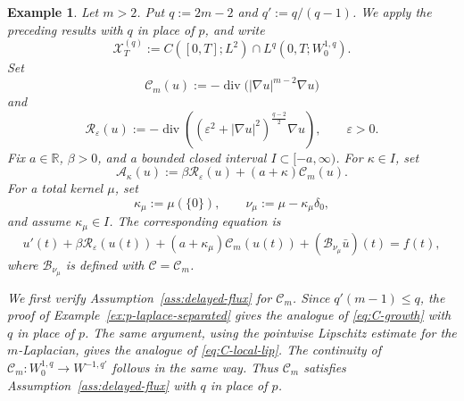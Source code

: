 \documentclass[a4paper,11pt,oneside,reqno]{amsart}
\newtheorem{example}[theorem]{Example}
\newcounter{c}
\newcounter{d}
\newcounter{b}
\newcommand{\R}{\mathbb{R}}
\newcommand{\diver}{\operatorname{div}}
\begin{document}
\begin{example}
\label{ex:collapsing-atom}
Let \(m>2\). Put \(q:=2m-2\) and \(q':=q/(q-1)\).
We apply the preceding results with \(q\) in place of \(p\), and write
\[
 \mathcal X_T^{(q)}
 :=
 C([0,T];L^2)\cap L^q(0,T;W^{1,q}_0).
\]
Set
\[
 \mathcal C_m(u):=
 -\diver\bigl(|\nabla u|^{m-2}\nabla u\bigr)
\]
and
\[
 \mathcal R_\varepsilon(u)
 :=
 -\diver\left(
 (\varepsilon^2+|\nabla u|^2)^{\frac{q-2}{2}}\nabla u
 \right),
 \qquad \varepsilon>0 .
\]
Fix \(a\in\R\), \(\beta>0\), and a bounded closed interval
\(I\subset[-a,\infty)\). For \(\kappa\in I\), set
\[
 \mathcal A_\kappa(u)
 :=
 \beta\mathcal R_\varepsilon(u)
 +(a+\kappa)\mathcal C_m(u).
\]
For a total kernel \(\mu\), set
\[
 \kappa_\mu:=\mu(\{0\}),
 \qquad
 \nu_\mu:=\mu-\kappa_\mu\delta_0,
\]
and assume \(\kappa_\mu\in I\). The corresponding equation is
\[
 u'(t)+\beta\mathcal R_\varepsilon(u(t))
 +(a+\kappa_\mu)\mathcal C_m(u(t))
 +(\mathcal B_{\nu_\mu}\bar u)(t)=f(t),
\]
where \(\mathcal B_{\nu_\mu}\) is defined with \(\mathcal C=\mathcal C_m\).

We first verify Assumption~\ref{ass:delayed-flux} for \(\mathcal C_m\).
Since \(q'(m-1)\le q\), the proof of Example~\ref{ex:p-laplace-separated}
gives the analogue of \eqref{eq:C-growth} with \(q\) in place of \(p\).
The same argument, using the pointwise Lipschitz estimate for the
\(m\)-Laplacian, gives the analogue of \eqref{eq:C-local-lip}. The continuity
of \(\mathcal C_m:W^{1,q}_0\to W^{-1,q'}\) follows in the same way. Thus
\(\mathcal C_m\) satisfies Assumption~\ref{ass:delayed-flux} with \(q\) in
place of \(p\).


\end{example}
\end{document}
